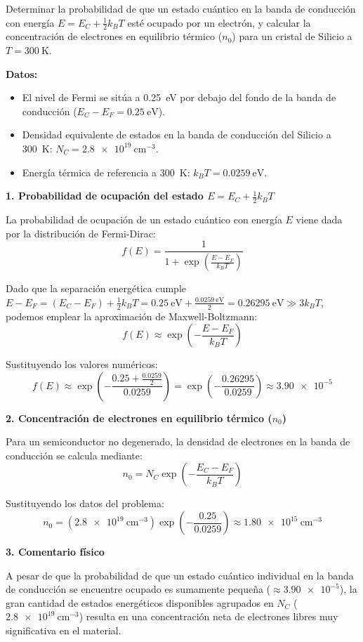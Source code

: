 \newpage

\begin{problema}
Determinar la probabilidad de que un estado cuántico en la banda de conducción con energía $E = E_C + \frac{1}{2} k_B T$ esté ocupado por un electrón, y calcular la concentración de electrones en equilibrio térmico ($n_0$) para un cristal de Silicio a $T = \SI{300}{\kelvin}$.

\textbf{Datos:}
\begin{itemize}
    \item El nivel de Fermi se sitúa a \SI{0.25}{\eV} por debajo del fondo de la banda de conducción ($E_C - E_F = \SI{0.25}{\eV}$).
    \item Densidad equivalente de estados en la banda de conducción del Silicio a \SI{300}{\kelvin}: $N_C = \SI{2.8e19}{\cm^{-3}}$.
    \item Energía térmica de referencia a \SI{300}{\kelvin}: $k_B T = \SI{0.0259}{\eV}$.
\end{itemize}
\tcblower
\textbf{1. Probabilidad de ocupación del estado $E = E_C + \frac{1}{2}k_B T$}

La probabilidad de ocupación de un estado cuántico con energía $E$ viene dada por la distribución de Fermi-Dirac:
\[
f(E) = \frac{1}{1 + \exp\left( \frac{E - E_F}{k_B T} \right)}
\]

Dado que la separación energética cumple $E - E_F = (E_C - E_F) + \frac{1}{2}k_B T = \SI{0.25}{\eV} + \frac{\SI{0.0259}{\eV}}{2} = \SI{0.26295}{\eV} \gg 3 k_B T$, podemos emplear la aproximación de Maxwell-Boltzmann:
\[
f(E) \approx \exp\left( -\frac{E - E_F}{k_B T} \right)
\]

Sustituyendo los valores numéricos:
\[
f(E) \approx \exp\left( -\frac{0.25 + \frac{0.0259}{2}}{0.0259} \right) = \exp\left( -\frac{0.26295}{0.0259} \right) \approx \num{3.90e-5}
\]

\textbf{2. Concentración de electrones en equilibrio térmico ($n_0$)}

Para un semiconductor no degenerado, la densidad de electrones en la banda de conducción se calcula mediante:
\[
n_0 = N_C \exp\left( -\frac{E_C - E_F}{k_B T} \right)
\]

Sustituyendo los datos del problema:
\[
n_0 = (\SI{2.8e19}{\cm^{-3}}) \exp\left( -\frac{0.25}{0.0259} \right) \approx \SI{1.80e15}{\cm^{-3}}
\]

\textbf{3. Comentario físico}

A pesar de que la probabilidad de que un estado cuántico individual en la banda de conducción se encuentre ocupado es sumamente pequeña ($\approx \num{3.90e-5}$), la gran cantidad de estados energéticos disponibles agrupados en $N_C$ ($\SI{2.8e19}{\cm^{-3}}$) resulta en una concentración neta de electrones libres muy significativa en el material.
\end{problema}

